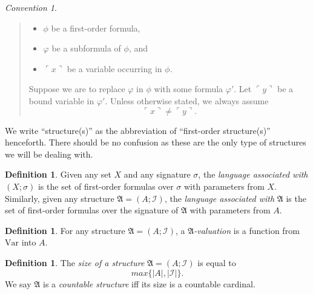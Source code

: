 \documentclass[12pt, twoside]{memoir}
\numberwithin{equation}{section}
\theoremstyle{definition}
\newtheorem{defi}[thm]{Definition}
\theoremstyle{remark}
\newtheorem{con}[thm]{Convention}
\theoremstyle{definition}
\theoremstyle{definition}
\theoremstyle{definition}
\theoremstyle{remark}
\begin{document}
\begin{con}
\begin{enumerate}[label=(\arabic*)]
\begin{quote}
\begin{itemize}
            \item $\phi$ be a first-order formula, 
            \item $\varphi$ be a subformula of $\phi$, and
            \item $\ulcorner x \urcorner$ be a variable occurring in $\phi$.
        \end{itemize}
        Suppose we are to replace $\varphi$ in $\phi$ with some formula $\varphi'$. Let $\ulcorner y \urcorner$ be a bound variable in $\varphi'$. Unless otherwise stated, we always assume $$\ulcorner x \urcorner \neq \ulcorner y \urcorner \text{.}$$        
    \end{quote}
\end{enumerate}
\end{con}

We write ``structure(s)'' as the abbreviation of ``first-order structure(s)'' henceforth. There should be no confusion as these are the only type of structures we will be dealing with.

\begin{defi}
Given any set $X$ and any signature $\sigma$, the \emph{language associated with} $(X; \sigma)$ is the set of first-order formulas over $\sigma$ with parameters from $X$. Similarly, given any structure $\mathfrak{A} = (A; \mathcal{I})$, the \emph{language associated with} $\mathfrak{A}$ is the set of first-order formulas over the signature of $\mathfrak{A}$ with parameters from $A$.
\end{defi}

\begin{defi}
For any structure $\mathfrak{A} = (A; \mathcal{I})$, a $\mathfrak{A}$\emph{-valuation} is a function from $\mathrm{Var}$ into $A$.
\end{defi}

\begin{defi}
The \emph{size of a structure} $\mathfrak{A} = (A; \mathcal{I})$ is equal to $$max\{|A|, |\mathcal{I}|\}.$$ We say $\mathfrak{A}$ is a \emph{countable structure} iff its size is a countable cardinal.
\end{defi}
\end{document}
